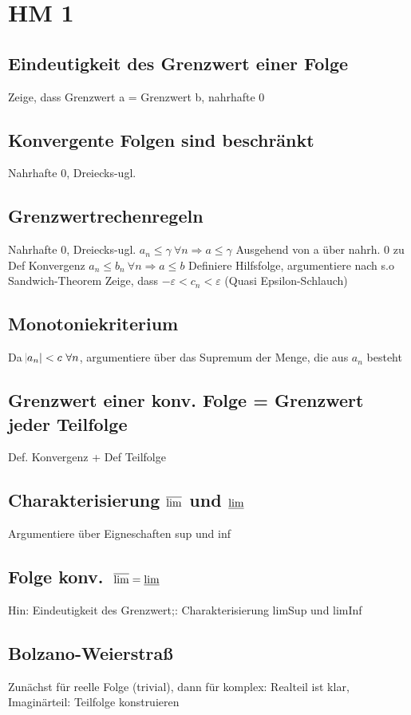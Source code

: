 \section{HM 1}

\subsection{Eindeutigkeit des Grenzwert einer Folge }
 Zeige, dass Grenzwert a = Grenzwert b, nahrhafte 0
\subsection{Konvergente Folgen sind beschränkt }
 Nahrhafte 0, Dreiecks-ugl.
\subsection{Grenzwertrechenregeln }
 Nahrhafte 0, Dreiecks-ugl.
$a_n \leq \gamma\ \forall n \Rightarrow a \leq \gamma$
 Ausgehend von a über nahrh. 0 zu Def Konvergenz
$a_n \leq b_n\ \forall n \Rightarrow a\leq b$
 Definiere Hilfsfolge, argumentiere nach s.o
Sandwich-Theorem
 Zeige, dass $-\varepsilon < c_n < \varepsilon$  (Quasi Epsilon-Schlauch)
\subsection{Monotoniekriterium }
 Da $\abs{a_n} < c\ \forall n$, argumentiere über das Supremum der Menge, die aus $a_n$ besteht
\subsection{Grenzwert einer konv. Folge = Grenzwert jeder Teilfolge }
 Def. Konvergenz + Def Teilfolge
\subsection{Charakterisierung $\varlimsup$ und $\varliminf$ }
 Argumentiere über Eigneschaften sup und inf
\subsection{Folge konv.\ $\varlimsup = \varliminf$ }
 Hin: Eindeutigkeit des Grenzwert;: Charakterisierung limSup und limInf
\subsection{Bolzano-Weierstraß }
 Zunächst für reelle Folge (trivial), dann für komplex: Realteil ist klar, Imaginärteil: Teilfolge konstruieren
